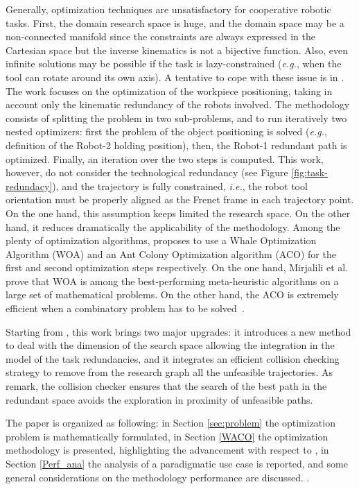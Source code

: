 \documentclass[twocolumn]{svjour3}
\newcommand{\figref}[1]{Figure \ref{#1}}
\begin{document}
%
Generally, optimization techniques are unsatisfactory for cooperative robotic tasks. First, the domain research space is huge, and the domain space may be a non-connected manifold since the constraints are always expressed in the Cartesian space but the inverse kinematics is not a bijective function. 
%
Also, even infinite solutions may be possible if the task is lazy-constrained (\textit{e.g.}, when the tool can rotate around its own axis). 
%
A tentative to cope with these issue is in \cite{Nicola2018}. The work focuses on the optimization of the workpiece positioning, taking in account only the kinematic redundancy of the robots involved. The methodology consists of splitting the problem in two sub-problems, and to run iteratively two nested optimizers: first the problem of the object positioning is solved (\textit{e.g.}, definition of the Robot-2 holding position), then, the Robot-1 redundant path is optimized. Finally, an iteration over the two steps is computed. This work, however, do not consider the technological redundancy (see \figref{fig:task-redundacy}), and the trajectory is fully constrained, \textit{i.e.}, the robot tool orientation must be properly aligned as the Frenet frame in each trajectory point. On the one hand, this assumption keeps limited the research space. On the other hand, it reduces dramatically the applicability of the methodology.
%
Among the plenty of optimization algorithms,  \cite{Nicola2018} proposes to use a Whale Optimization Algorithm (WOA) and an Ant Colony Optimization algorithm (ACO) for the first and second optimization steps respectively. On the one hand, Mirjalili et al.~\cite{Mirjalili2016} prove that WOA is among the best-performing meta-heuristic algorithms on a large set of mathematical problems. On the other hand, the ACO is extremely efficient when a combinatory problem has to be solved~\cite{Dorigo2006}. 


Starting from \cite{Nicola2018},  this work brings two major upgrades: it introduces a new method to
deal with the dimension of the search space allowing the integration in the model of the task redundancies, and it integrates an efficient collision checking strategy to remove from the research graph all the unfeasible trajectories. 
%
As remark, the collision checker ensures that the search of the best path in the redundant space avoids the exploration in proximity of unfeasible paths.

The paper is organized as following: in Section \ref{sec:problem} the optimization problem is mathematically formulated, in Section \ref{WACO} the optimization methodology is presented, highlighting the advancement with respect to \cite{Nicola2018}, in Section \ref{Perf_ana} the analysis of a paradigmatic use case is reported, and some general considerations on the methodology performance are discussed. . 
\end{document}
